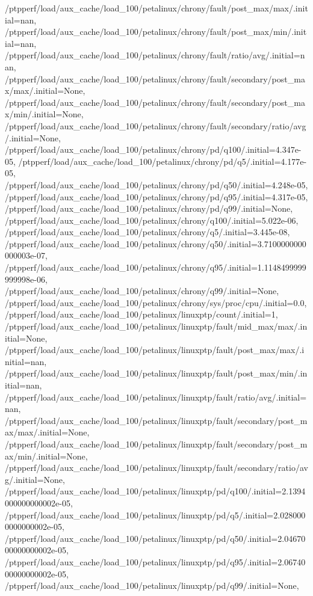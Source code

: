 {    /ptpperf/load/aux_cache/load_100/petalinux/chrony/fault/post_max/max/.initial=nan,
    /ptpperf/load/aux_cache/load_100/petalinux/chrony/fault/post_max/min/.initial=nan,
    /ptpperf/load/aux_cache/load_100/petalinux/chrony/fault/ratio/avg/.initial=nan,
    /ptpperf/load/aux_cache/load_100/petalinux/chrony/fault/secondary/post_max/max/.initial=None,
    /ptpperf/load/aux_cache/load_100/petalinux/chrony/fault/secondary/post_max/min/.initial=None,
    /ptpperf/load/aux_cache/load_100/petalinux/chrony/fault/secondary/ratio/avg/.initial=None,
    /ptpperf/load/aux_cache/load_100/petalinux/chrony/pd/q100/.initial=4.347e-05,
    /ptpperf/load/aux_cache/load_100/petalinux/chrony/pd/q5/.initial=4.177e-05,
    /ptpperf/load/aux_cache/load_100/petalinux/chrony/pd/q50/.initial=4.248e-05,
    /ptpperf/load/aux_cache/load_100/petalinux/chrony/pd/q95/.initial=4.317e-05,
    /ptpperf/load/aux_cache/load_100/petalinux/chrony/pd/q99/.initial=None,
    /ptpperf/load/aux_cache/load_100/petalinux/chrony/q100/.initial=5.022e-06,
    /ptpperf/load/aux_cache/load_100/petalinux/chrony/q5/.initial=3.445e-08,
    /ptpperf/load/aux_cache/load_100/petalinux/chrony/q50/.initial=3.7100000000000003e-07,
    /ptpperf/load/aux_cache/load_100/petalinux/chrony/q95/.initial=1.1148499999999998e-06,
    /ptpperf/load/aux_cache/load_100/petalinux/chrony/q99/.initial=None,
    /ptpperf/load/aux_cache/load_100/petalinux/chrony/sys/proc/cpu/.initial=0.0,
    /ptpperf/load/aux_cache/load_100/petalinux/linuxptp/count/.initial=1,
    /ptpperf/load/aux_cache/load_100/petalinux/linuxptp/fault/mid_max/max/.initial=None,
    /ptpperf/load/aux_cache/load_100/petalinux/linuxptp/fault/post_max/max/.initial=nan,
    /ptpperf/load/aux_cache/load_100/petalinux/linuxptp/fault/post_max/min/.initial=nan,
    /ptpperf/load/aux_cache/load_100/petalinux/linuxptp/fault/ratio/avg/.initial=nan,
    /ptpperf/load/aux_cache/load_100/petalinux/linuxptp/fault/secondary/post_max/max/.initial=None,
    /ptpperf/load/aux_cache/load_100/petalinux/linuxptp/fault/secondary/post_max/min/.initial=None,
    /ptpperf/load/aux_cache/load_100/petalinux/linuxptp/fault/secondary/ratio/avg/.initial=None,
    /ptpperf/load/aux_cache/load_100/petalinux/linuxptp/pd/q100/.initial=2.1394000000000002e-05,
    /ptpperf/load/aux_cache/load_100/petalinux/linuxptp/pd/q5/.initial=2.0280000000000002e-05,
    /ptpperf/load/aux_cache/load_100/petalinux/linuxptp/pd/q50/.initial=2.0467000000000002e-05,
    /ptpperf/load/aux_cache/load_100/petalinux/linuxptp/pd/q95/.initial=2.0674000000000002e-05,
    /ptpperf/load/aux_cache/load_100/petalinux/linuxptp/pd/q99/.initial=None,
}
